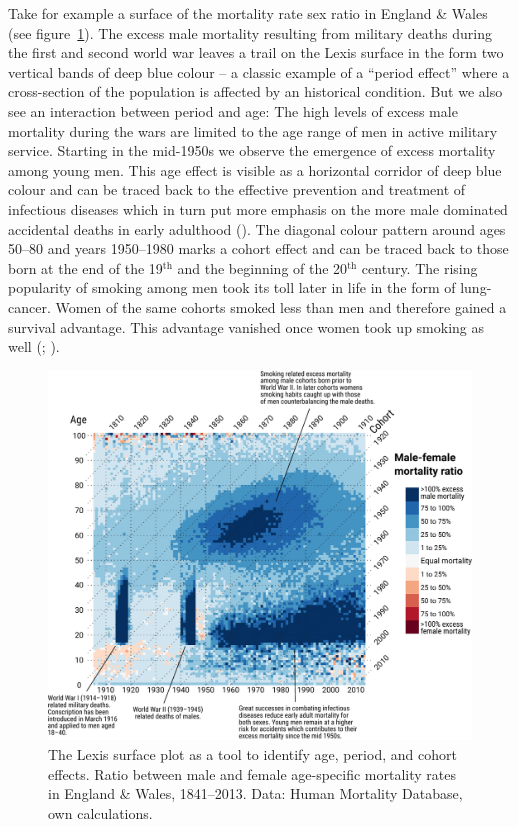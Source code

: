\documentclass[parskip=half]{scrartcl}
\begin{document}
Take for example a surface of the mortality rate sex ratio in England \& Wales (see figure~\ref{fig:lexis_surface}). The excess male mortality resulting from military deaths during the first and second world war leaves a trail on the Lexis surface in the form two vertical bands of deep blue colour -- a classic example of a \enquote{period effect} where a cross-section of the population is affected by an historical condition. But we also see an interaction between period and age: The high levels of excess male mortality during the wars are limited to the age range of men in active military service. Starting in the mid-1950s we observe the emergence of excess mortality among young men. This age effect is visible as a horizontal corridor of deep blue colour and can be traced back to the effective prevention and treatment of infectious diseases which in turn put more emphasis on the more male dominated accidental deaths in early adulthood (\cite{Gjonca2005}). The diagonal colour pattern around ages 50--80 and years 1950--1980 marks a cohort effect and can be traced back to those born at the end of the 19$^\text{th}$ and the beginning of the 20$^\text{th}$ century. The rising popularity of smoking among men took its toll later in life in the form of lung-cancer. Women of the same cohorts smoked less than men and therefore gained a survival advantage. This advantage vanished once women took up smoking as well (\cite{Preston2006}; \cite{Beltran-Sanchez2015}).

\begin{figure}[!htb]
  \centering
  \includegraphics[width = \textwidth]{./fig/lexis_surface.pdf}
  \caption{The Lexis surface plot as a tool to identify age, period, and cohort effects. Ratio between male and female age-specific mortality rates in England \& Wales, 1841--2013. Data: Human Mortality Database, own calculations.}
  \label{fig:lexis_surface}
\end{figure}
\end{document}
